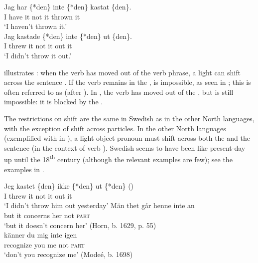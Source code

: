 \documentclass[output=paper]{langscibook}
\begin{document}
\ex\label{ex:lalu:47b}
\gll Jag    har   \{*den\}  inte   \{*den\}   kastat   \{den\}.\\
    I       have     it    not     it     thrown     it\\
\glt `I haven’t thrown it.’\\
\ex\label{ex:lalu:47c}
\gll Jag  kastade   \{*den\}   inte   \{*den\}   ut     \{den\}.\\
    I     threw       it      not     it      out     it      \\
\glt `I didn’t throw it out.'
\z
\z


 illustrates : when the verb has moved out of the verb phrase, a light  can shift across the sentence . If the verb remains in the ,  is impossible, as seen in ; this is often referred to as  (after \citealt{Holmberg1986}). In , the verb has moved out of the , but  is still impossible: it is blocked by the .



The restrictions on  shift are the same in Swedish as in the other North  languages, with the exception of shift across particles. In the other North  languages (exemplified with  in ), a light object pronoun must shift across both the  and the sentence  (in the context of verb ). Swedish seems to have been like present-day  up until the 18\textsuperscript{th} century (although the relevant examples are few); see the examples in .


\ea\label{ex:lalu:48}
\gll Jeg  kastet \{den\}     ikke   \{*den\}   ut   \{*den\}      ()\\
I       threw   it      not       it      out         it\\
\glt `I didn’t throw him out yesterday'
\ex\label{ex:lalu:49}
\ea
\gll  Män   thet   går           henne   inte     an\\
    but       it    concerns   her   not     \textsc{part}\\
  \glt `but it doesn’t concern her’ (Horn, b. 1629, p. 55)\\

\ex
\gll  känner     du   mig     inte     igen \\
    recognize   you   me     not     \textsc{part}\\
\glt `don’t you recognize me’ (Modeé, b. 1698)\\
\z
\z
\end{document}
